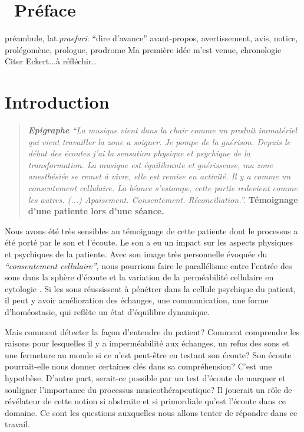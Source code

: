 
\chapter*{\ Préface}
préambule, lat.\textit{praefari}: ``dire d'avance''
avant-propos, avertissement, avis, notice, prolégomène, prologue, prodrome
Ma première idée m'est venue, chronologie
Citer Eckert...à réfléchir..

\chapter{Introduction}



\begin{quotation}
 \textit{\textbf{Epigraphe  }   ``La musique vient dans la chair comme un produit immatériel
 qui vient travailler la zone a soigner. Je pompe de la
 guérison.
Depuis le début des écoutes j'ai la sensation physique et
 psychique de la
 transformation.
 La musique est équilibrante et guérisseuse, ma zone
 anesthésiée se remet à vivre, elle est remise en activité.
 Il y a comme un consentement cellulaire.
La béance s'estompe, cette
partie redevient comme les autres. (...)
Apaisement. Consentement. Réconciliation.''.} \textbf{Témoignage d'une
patiente lors d'une séance.}

\end{quotation}

Nous avons été très sensibles au témoignage de cette patiente dont le
processus a été porté par le son et l'écoute. Le son a eu un impact
sur les aspects physiques
et psychiques de la patiente.
Avec son image très personnelle évoquée du
\textit{``consentement cellulaire''}, nous pourrions faire le
parallélisme entre l'entrée des sons dans la sphère d'écoute et la variation de la 
perméabilité cellulaire en cytologie \autocite[ch. 3 pp. 70--76]{marieb:biologie}. Si les sons réussissent à pénétrer dans la
cellule psychique du patient, il peut y avoir amélioration des
échanges, une 
communication, une forme d'homéostasie,  \autocite[ch. 1
pp. 10]{marieb:biologie} qui reflète un état d'équilibre dynamique.

Mais comment détecter la façon d'entendre du patient?
Comment comprendre les raisons pour lesquelles il y a imperméabilité aux
échanges, un refus des sons et une fermeture au monde si ce n'est
peut-être  en testant
son écoute?  Son écoute pourrait-elle nous donner certaines clés dans sa
compréhension? C'est une hypothèse.
D'autre part, serait-ce  possible  par un test d'écoute
de marquer et souligner l'importance du processus musicothérapeutique? 
Il jouerait un
rôle de
révélateur de cette notion si abstraite et si primordiale qu'est
l'écoute dans ce domaine.
Ce sont les questions auxquelles nous allons tenter de
répondre dans ce travail.


